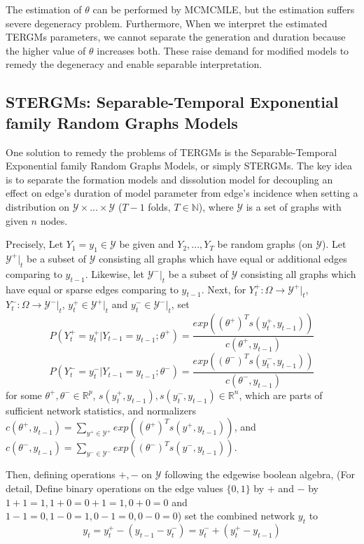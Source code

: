 \documentclass[aspectratio=169,ignorenonframetext,9pt]{beamer}
\theoremstyle{plain}
\theoremstyle{definition}
\begin{document}
The estimation of $\theta$ can be performed by MCMCMLE,
but the estimation suffers severe degeneracy problem.
Furthermore, When we interpret the estimated TERGMs parameters,
we cannot separate the generation and duration because
the higher value of $\theta$ increases both.
These raise demand for modified models to remedy the degeneracy and enable separable interpretation.

\subsection{STERGMs: Separable-Temporal Exponential family Random Graphs Models}
One solution to remedy the problems of TERGMs is 
the Separable-Temporal Exponential family Random Graphs Models, or simply STERGMs. %
The key idea is to separate the formation models and dissolution model
for decoupling an effect on edge's duration of model parameter from edge's incidence
when setting a distribution on $\mathcal{Y}\times ... \times \mathcal{Y}$ ($T-1$ folds, $T\in\mathbb{N}$),
where $\mathcal{Y}$ is a set of graphs with given $n$ nodes.

Precisely,
Let $Y_1=y_1 \in \mathcal{Y}$ be given and $Y_2,...,Y_T$ be random graphs (on $\mathcal{Y}$).
Let $\mathcal{Y}^+|_t$ be a subset of $\mathcal{Y}$ consisting all graphs which have equal or additional edges comparing to $y_{t-1}$.
Likewise, let $\mathcal{Y}^-|_t$ be a subset of $\mathcal{Y}$ consisting all graphs which have equal or sparse edges comparing to $y_{t-1}$.
Next, for $Y_t^+: \Omega \to\mathcal{Y}^+|_t$, $Y_t^-: \Omega \to\mathcal{Y}^-|_t$, $y_t^+ \in \mathcal{Y}^+|_t$ and $y_t^- \in \mathcal{Y}^-|_t$, set
\[P(Y_t^+=y_t^+|Y_{t-1}=y_{t-1};\theta^+) = \frac{exp((\theta^+)^{T}s(y_t^+, y_{t-1}))}{c(\theta^+, y_{t-1})}\]
\[P(Y_t^-=y_t^-|Y_{t-1}=y_{t-1};\theta^-) = \frac{exp((\theta^-)^{T}s(y_t^-, y_{t-1}))}{c(\theta^-, y_{t-1})}\]
for some $\theta^+,\theta^-\in\mathbb{R}^p$, $s(y_t^+, y_{t-1}), s(y_t^-, y_{t-1})\in\mathbb{R}^n$, which are parts of sufficient network statistics,
and normalizers $c(\theta^+, y_{t-1})=\sum_{y^+\in\mathcal{Y}^+}exp((\theta^+)^{T}s(y^+, y_{t-1}))$, 
and $c(\theta^-, y_{t-1})=\sum_{y^-\in\mathcal{Y}^-}exp((\theta^-)^{T}s(y^-, y_{t-1}))$.

Then, defining operations $+,-$ on $\mathcal{Y}$ following the edgewise boolean algebra,
(For detail, Define binary operations on the edge values $\{0,1\}$ by $+$ and $-$ 
by $1+1=1, 1+0=0+1=1, 0+0=0$ and $1-1=0, 1-0=1, 0-1=0, 0-0=0$) 
set the combined network $y_t$ to
\[y_t=y_t^+ - (y_{t-1} - y_t^-) = y_t^- + (y_t^+ - y_{t-1})\]
\end{document}
